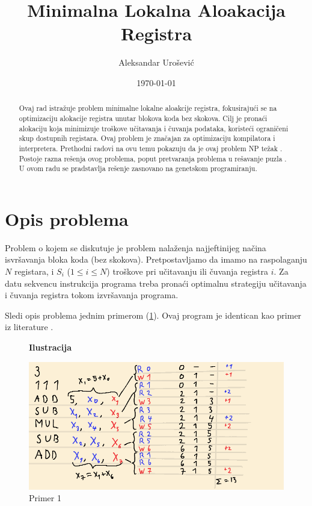 \documentclass[a4paper, 12pt]{article}
\begin{document}
\title{Minimalna Lokalna Aloakacija Registra}
\author{Aleksandar Urošević}
\date{\today}
\maketitle

\begin{abstract}
Ovaj rad istražuje problem minimalne lokalne aloakcije registra, fokusirajući se na optimizaciju alokacije registra unutar blokova koda bez skokova. Cilj je pronaći alokaciju koja minimizuje troškove učitavanja i čuvanja podataka, koristeći ograničeni skup dostupnih registara. Ovaj problem je značajan za optimizaciju kompilatora i interpretera. Prethodni radovi na ovu temu pokazuju da je ovaj problem NP težak \cite{OnLocalRegisterAllocation}. Postoje razna rešenja ovog problema, poput pretvaranja problema u rešavanje puzla \cite{RegisterAllocationByPuzzleSolving}. U ovom radu se pradstavlja rešenje zasnovano na genetskom programiranju.
\end{abstract}

\section{Opis problema}
Problem o kojem se diskutuje je problem nalaženja najjeftinijeg načina isvršavanja bloka koda (bez skokova). Pretpostavljamo da imamo na raspolaganju $N$ registara, i $S_i$ ($1 \leq i \leq N$) troškove pri učitavanju ili čuvanja registra $i$. Za datu sekvencu instrukcija programa treba pronaći optimalnu strategiju učitavanja i čuvanja registra tokom izvršavanja programa. 

Sledi opis problema jednim primerom (\ref{primer1}). Ovaj program je identican kao primer iz literature \cite{EvaluationOfAlgorithmsForLocalRegisterAllocation}.

\begin{figure}
\centering
\textbf{Ilustracija}\par\medskip
\includegraphics[scale=0.45]{Image/Illustration1}
\caption{Primer 1}
\label{primer1}
\end{figure}
\end{document}

